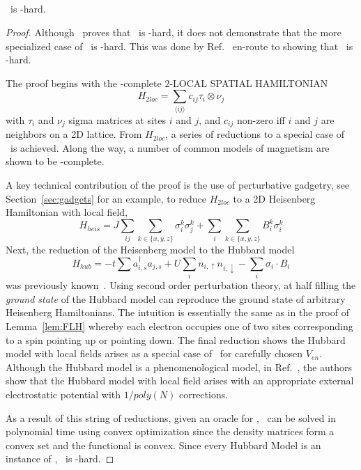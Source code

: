 \documentclass[11pt,oneside,final]{huthesis}%
\begin{document}
\subsection{\UF}
\begin{theorem}
	\UF~is \qma-hard.
\end{theorem}
\begin{proof}
Although \REP~proves that \FLH~is \qma-hard, it does not demonstrate that the more specialized case of \ES~is \qma-hard.  This was done by Ref.~\cite{Schuch09} en-route to showing that \UF~is \qma-hard.  

The proof begins with the \qma-complete $2$-{LOCAL SPATIAL HAMILTONIAN} $$H_{2loc}=\sum_{\langle ij\rangle}c_{ij}\tau_{i}\otimes \nu_{j}$$ with $\tau_{i}$ and $\nu_{j}$ sigma matrices at sites $i$ and $j$, and $c_{ij}$ non-zero iff $i$ and $j$ are neighbors on a 2D lattice.  From $H_{2loc}$, a series of reductions to a special case of \ES~is achieved.  Along the way, a number of common models of magnetism are shown to be \qma-complete.  

A key technical contribution of the proof is the use of perturbative gadgetry, see Section~\ref{sec:gadgets} for an example, to reduce $H_{2loc}$ to a 2D Heisenberg Hamiltonian with local field, \[H_{heis}=J\sum_{ij}\sum_{k\in\{x,y,z\}} \sigma^k_i\sigma^k_j +\sum_i\sum_{k\in\{x,y,z\}}B^k_i\sigma_i^k\] Next, the reduction of the Heisenberg model to the Hubbard model 
\[H_{hub}=-t\sum a_{i,s}^\dagger a_{j,s}+U\sum_i n_{i,\uparrow}n_{i,\downarrow}-\sum_i \sigma_i\cdot B_i\]
was previously known~\cite{Cleveland76}. Using second order perturbation theory, at half filling the \emph{ground state} of the Hubbard model can reproduce the ground state of arbitrary Heisenberg Hamiltonians.  The intuition is essentially the same as in the proof of Lemma~\ref{lem:FLH} whereby each electron occupies one of two sites corresponding to a spin pointing up or pointing down.  The final reduction shows the Hubbard model with local fields arises as a special case of \ES~for carefully chosen $V_{en}$.
Although the Hubbard model is a phenomenological model, in Ref.~\cite{Schuch09}, the authors show that the Hubbard model with local field arises with an appropriate external electrostatic potential with $1/poly(N)$ corrections.  %

As a result of this string of reductions, given an oracle for \UF, \ES~can be solved in polynomial time using convex optimization since the density matrices form a convex set and the functional is convex.  Since every Hubbard Model is an instance of \ES, \UF~is \qma-hard. 
\end{proof}
\end{document}
